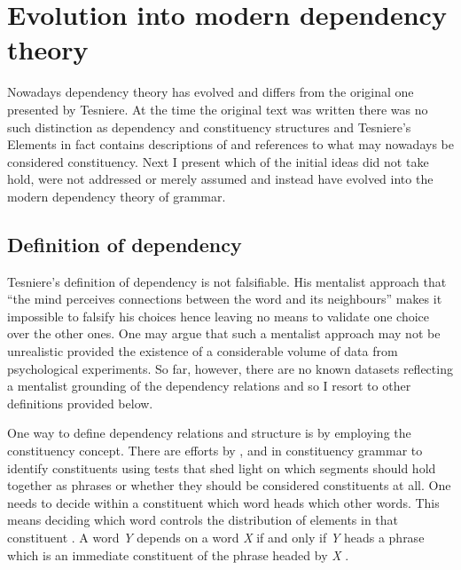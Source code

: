 

\section{Evolution into modern dependency theory}
    Nowadays dependency theory has evolved and differs from the original one presented by Tesniere. At the time the original text was written there was no such distinction as dependency and constituency structures and Tesniere's Elements \citep{Tesniere59} in fact contains descriptions of and references to what may nowadays be considered constituency. 
    Next I present which of the initial ideas did not take hold, were not addressed or merely assumed and instead have evolved into the modern dependency theory of grammar.

\subsection{Definition of dependency}
    Tesniere's definition of dependency is not falsifiable. His mentalist approach that ``the mind perceives connections between the word and its neighbours'' \citep[3]{Tesniere2015} makes it impossible to falsify his choices hence leaving no means to validate one choice over the other ones. One may argue that such a mentalist approach may not be unrealistic provided the existence of a considerable volume of data from psychological experiments. So far, however, there are no known datasets reflecting a mentalist grounding of the dependency relations and so I resort to other definitions provided below.
    
    One way to define dependency relations and structure is by employing the constituency concept. There are efforts by \citet{Bloomfield33}, \citet{Hockett58} and \citet{harris1951methods} in constituency grammar to identify constituents using tests that shed light on which segments should hold together as phrases or whether they should be considered constituents at all. One needs to decide within a constituent which word heads which other words. This means deciding which word controls the distribution of elements in that constituent \citep{Bloomfield33,Zwicky85-heads}. A word \textit{Y} depends on a word \textit{X} if and only if \textit{Y} heads a phrase which is an immediate constituent of the phrase headed by \textit{X} \citep{Lecerf1961}. 

